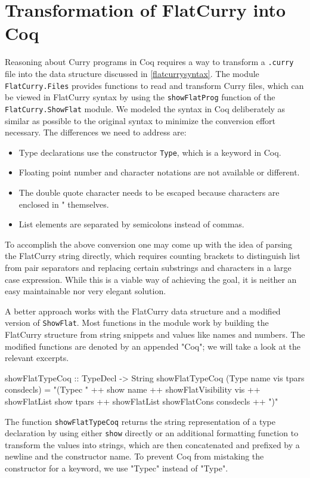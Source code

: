 \documentclass[paper = a4, fleqn, twoside]{scrreprt}
\newcommand{\coqinline}[1]{\texttt{#1}}
\begin{document}
\section{Transformation of FlatCurry into Coq}
\label{conversion}
Reasoning about Curry programs in Coq requires a way to transform a \texttt{.curry} file into the data structure discussed in \autoref{flatcurrysyntax}. The module \texttt{FlatCurry.Files} provides functions to read and transform Curry files, which can be viewed in FlatCurry syntax by using the \texttt{showFlatProg} function of the \texttt{FlatCurry.ShowFlat} module. We modeled the syntax in Coq deliberately as similar as possible to the original syntax to minimize the conversion effort necessary. The differences we need to address are:
\begin{itemize}
	\item Type declarations use the constructor \coqinline{Type}, which is a keyword in Coq.
	\item Floating point number and character notations are not available or different.
	\item The double quote character needs to be escaped because characters are enclosed in " themselves.
	\item List elements are separated by semicolons instead of commas.
\end{itemize}
To accomplish the above conversion one may come up with the idea of parsing the FlatCurry string directly, which requires counting brackets to distinguish list from pair separators and replacing certain substrings and characters in a large case expression. While this is a viable way of achieving the goal, it is neither an easy maintainable nor very elegant solution.
\par
A better approach works with the FlatCurry data structure and a modified version of \texttt{ShowFlat}. Most functions in the module work by building the FlatCurry structure from string snippets and values like names and numbers. The modified functions are denoted by an appended "Coq"; we will take a look at the relevant excerpts.
\begin{haskellcode}
showFlatTypeCoq :: TypeDecl -> String
showFlatTypeCoq (Type name vis tpars consdecls) =
  "\n  (Typec " ++ show name ++ showFlatVisibility vis
                ++ showFlatList show tpars
                ++ showFlatList showFlatCons consdecls ++ ")"
\end{haskellcode}
The function \texttt{showFlatTypeCoq} returns the string representation of a type declaration by using either \texttt{show} directly or an additional formatting function to transform the values into strings, which are then concatenated and prefixed by a newline and the constructor name. To prevent Coq from mistaking the constructor for a keyword,  we use "Typec" instead of "Type". 
\end{document}
